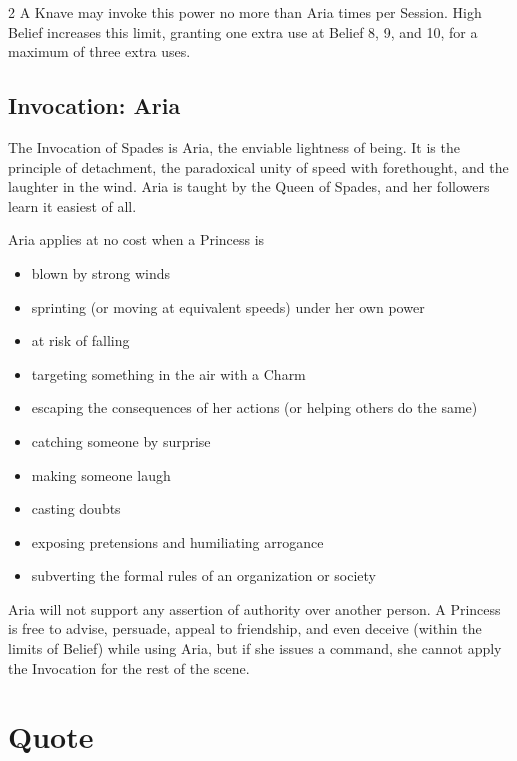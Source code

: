 \begin{multicols}{2}
A Knave may invoke this power no more than Aria times per Session. High Belief increases this limit, granting one extra use at Belief 8, 9, and 10, for a maximum of three extra uses. 

\subsection*{Invocation: Aria}

The Invocation of Spades is Aria, the enviable lightness of being. It is the principle of detachment, the paradoxical unity of speed with forethought, and the laughter in the wind. Aria is taught by the Queen of Spades, and her followers learn it easiest of all.

Aria applies at no cost when a Princess is
\begin{itemize}
\item blown by strong winds
\item sprinting (or moving at equivalent speeds) under her own power
\item at risk of falling 
\item targeting something in the air with a Charm 
\item escaping the consequences of her actions (or helping others do the same)
\item catching someone by surprise
\item making someone laugh
\item casting doubts
\item exposing pretensions and humiliating arrogance
\item subverting the formal rules of an organization or society 
\end{itemize}

Aria will not support any assertion of authority over another person. A Princess is free to advise, persuade, appeal to friendship, and even deceive (within the limits of Belief) while using Aria, but if she issues a command, she cannot apply the Invocation for the rest of the scene. %

\section*{Quote}


\end{multicols}
